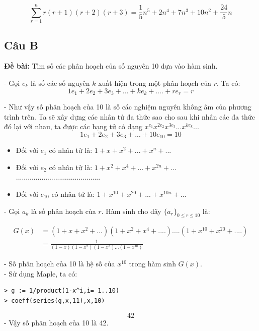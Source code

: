 \documentclass[12pt]{article}
\begin{document}
\begin{sloppypar}
\begin{equation*}
    \sum_{r=1}^{n}r(r + 1)(r + 2)(r + 3) = \frac{1}{5}n^{5} + 2n^{4} + 7n^{3} + 10n^{2} + \frac{24}{5}n
\end{equation*}



\subsection{Câu B}
\begin{tcolorbox}
    \textbf{Đề bài:} Tìm số các phân hoạch của số nguyên 10 dựa vào hàm sinh.
\end{tcolorbox}

- Gọi \(e_{k}\) là số các số nguyên \(k\) xuất hiện trong một phân hoạch của \(r\). Ta có: \\
\begin{equation*}
    1e_{1} + 2e_{2} + 3e_{3} +...+ ke_{k} + ....+re_{r} = r
\end{equation*}

- Như vậy số phân hoạch của 10 là số các nghiệm nguyên không âm của phương trình trên. Ta sẽ xây dựng các nhân tử đa thức sao cho sau khi nhân các đa thức đó lại với nhau, ta được các hạng tử có dạng \(x^{e_{1}}x^{2e_{2}}x^{3e_{3}}...x^{ke_{k}}...\)
\begin{equation*}
    1e_{1} + 2e_{2} + 3e_{3} +...+ 10e_{10} = 10
\end{equation*}

\begin{itemize}
    \item Đối với \(e_{1}\) có nhân tử là: \(1 + x + x^{2} + ... + x^{n} + ...\)
    \item Đối với \(e_{2}\) có nhân tử là: \(1 + x^{2} + x^{4} + ... + x^{2n} + ...\)
    \\ ...........................................
    \item Đối với \(e_{10}\) có nhân tử là: \(1 + x^{10} + x^{20} + ... + x^{10n} + ...\)
\end{itemize}
- Gọi \(a_{k}\) là số phân hoạch của \(r\). Hàm sinh cho dãy \(\{a_{r}\}_{0 \leq r \leq 10}\) là:

\begin{align*}
    G(x) & = (1 + x + x^{2} + ...)(1 + x^{2} + x^{4} + ....)....(1+x^{10}+x^{20}+....) \\
         & = \frac{1}{(1-x)(1-x^{2})(1-x^{3})...(1-x^{10})}  
\end{align*}

- Số phân hoạch của 10 là hệ số của \(x^{10}\) trong hàm sinh \(G(x)\). \\
- Sử dụng Maple, ta có:
\begin{verbatim}
> g := 1/product(1-x^i,i= 1..10)
> coeff(series(g,x,11),x,10)
\end{verbatim}
\begin{equation*}
    42
\end{equation*}
- Vậy số phân hoạch của 10 là 42.


\end{sloppypar}
\end{document}
